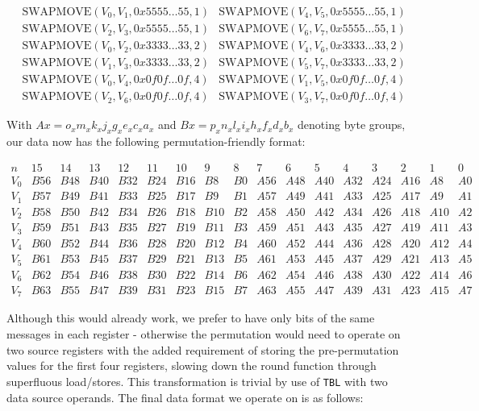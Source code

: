 \begin{align*}
    &\text{SWAPMOVE}(V_0,V_1,0x5555\dots 55,1) &\text{SWAPMOVE}(V_4,V_5,0x5555\dots 55,1) \\
    &\text{SWAPMOVE}(V_2,V_3,0x5555\dots 55,1) &\text{SWAPMOVE}(V_6,V_7,0x5555\dots 55,1) \\
    &\text{SWAPMOVE}(V_0,V_2,0x3333\dots 33,2) &\text{SWAPMOVE}(V_4,V_6,0x3333\dots 33,2) \\
    &\text{SWAPMOVE}(V_1,V_3,0x3333\dots 33,2) &\text{SWAPMOVE}(V_5,V_7,0x3333\dots 33,2) \\
    &\text{SWAPMOVE}(V_0,V_4,0x0f0f\dots 0f,4) &\text{SWAPMOVE}(V_1,V_5,0x0f0f\dots 0f,4) \\
    &\text{SWAPMOVE}(V_2,V_6,0x0f0f\dots 0f,4) &\text{SWAPMOVE}(V_3,V_7,0x0f0f\dots 0f,4)
\end{align*}

With $Ax=o_xm_xk_xj_xg_xe_xc_xa_x$ and $Bx=p_xn_xl_xi_xh_xf_xd_xb_x$ denoting
byte groups, our data now has the following permutation-friendly format:

\scriptsize
\[
    \begin{array}{c|llllllll|llllllll}
        n & 15 & 14 & 13 & 12 & 11 & 10 & 9 & 8 & 7 & 6 & 5 & 4 & 3 & 2 & 1 & 0 \\
        \hline
        V_0 & B56 & B48 & B40 & B32 & B24 & B16 & B8  & B0 & A56 & A48 & A40 & A32 & A24 & A16 & A8  & A0 \\
        V_1 & B57 & B49 & B41 & B33 & B25 & B17 & B9  & B1 & A57 & A49 & A41 & A33 & A25 & A17 & A9  & A1 \\
        V_2 & B58 & B50 & B42 & B34 & B26 & B18 & B10 & B2 & A58 & A50 & A42 & A34 & A26 & A18 & A10 & A2 \\
        V_3 & B59 & B51 & B43 & B35 & B27 & B19 & B11 & B3 & A59 & A51 & A43 & A35 & A27 & A19 & A11 & A3 \\
        V_4 & B60 & B52 & B44 & B36 & B28 & B20 & B12 & B4 & A60 & A52 & A44 & A36 & A28 & A20 & A12 & A4 \\
        V_5 & B61 & B53 & B45 & B37 & B29 & B21 & B13 & B5 & A61 & A53 & A45 & A37 & A29 & A21 & A13 & A5 \\
        V_6 & B62 & B54 & B46 & B38 & B30 & B22 & B14 & B6 & A62 & A54 & A46 & A38 & A30 & A22 & A14 & A6 \\
        V_7 & B63 & B55 & B47 & B39 & B31 & B23 & B15 & B7 & A63 & A55 & A47 & A39 & A31 & A23 & A15 & A7
    \end{array}
\]
\normalsize

Although this would already work, we prefer to have only bits of the same
messages in each register - otherwise the permutation would need to operate on
two source registers with the added requirement of storing the pre-permutation
values for the first four registers, slowing down the round function through
superfluous load/stores. This transformation is trivial by use of
\texttt{TBL} with two data source operands. The final data format we operate on
is as follows:

